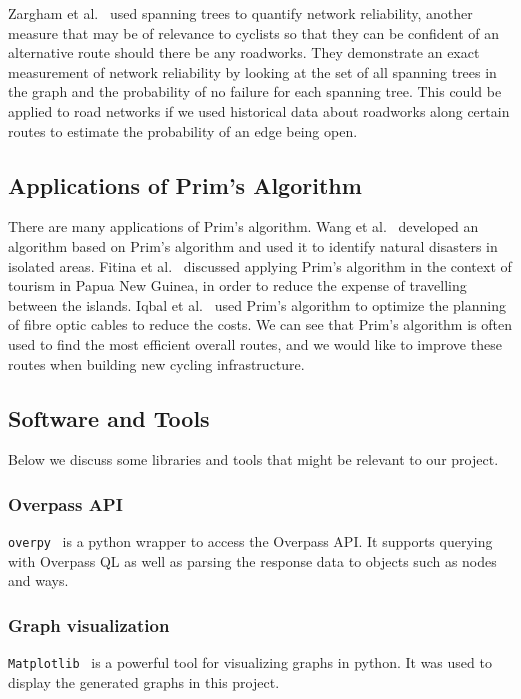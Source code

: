 \documentclass[12pt,a4paper]{report}
\begin{document}
Zargham et al.~\cite{zarghami2020} used spanning trees to quantify network reliability, another measure that may be of relevance to cyclists so that they can be confident of an alternative route should there be any roadworks. They demonstrate an exact measurement of network reliability by looking at the set of all spanning trees in the graph and the probability of no failure for each spanning tree. This could be applied to road networks if we used historical data about roadworks along certain routes to estimate the probability of an edge being open.

\subsection{Applications of Prim's Algorithm}
There are many applications of Prim's algorithm. Wang et al.~\cite{wang2018} developed an algorithm based on Prim's algorithm and used it to identify natural disasters in isolated areas. Fitina et al.~\cite{fitina} discussed applying Prim's algorithm in the context of tourism in Papua New Guinea, in order to reduce the expense of travelling between the islands. Iqbal et al.~\cite{iqbal2017} used Prim's algorithm to optimize the planning of fibre optic cables to reduce the costs. We can see that Prim's algorithm is often used to find the most efficient overall routes, and we would like to improve these routes when building new cycling infrastructure. 

\subsection{Software and Tools}
Below we discuss some libraries and tools that might be relevant to our project.

\subsubsection*{Overpass API}
\texttt{overpy}~\cite{overpy} is a python wrapper to access the Overpass API. It supports querying with Overpass QL as well as parsing the response data to objects such as nodes and ways. 

\subsubsection*{Graph visualization}
\texttt{Matplotlib}~\cite{Hunter:2007} is a powerful tool for visualizing graphs in python. It was used to display the generated graphs in this project.
\end{document}
